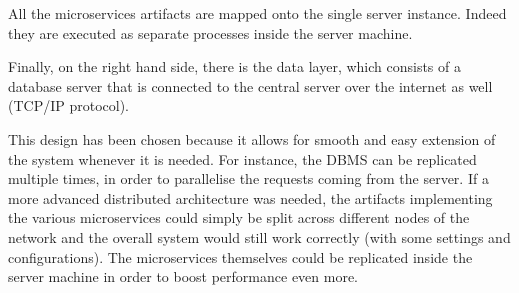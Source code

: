 All the microservices artifacts are mapped onto the single server instance. Indeed they are executed as separate processes inside the server machine.

Finally, on the right hand side, there is the data layer, which consists of a database server that is connected to the central server over the internet as well (TCP/IP protocol). 

This design has been chosen because it allows for smooth and easy extension of the system whenever it is needed. 
For instance, the DBMS can be replicated multiple times, in order to parallelise the requests coming from the server. 
If a more advanced distributed architecture was needed, the artifacts implementing the various microservices could simply be split across different nodes of the network and the overall system would still work correctly (with some settings and configurations).
The microservices themselves could be replicated inside the server machine in order to boost performance even more.
 

